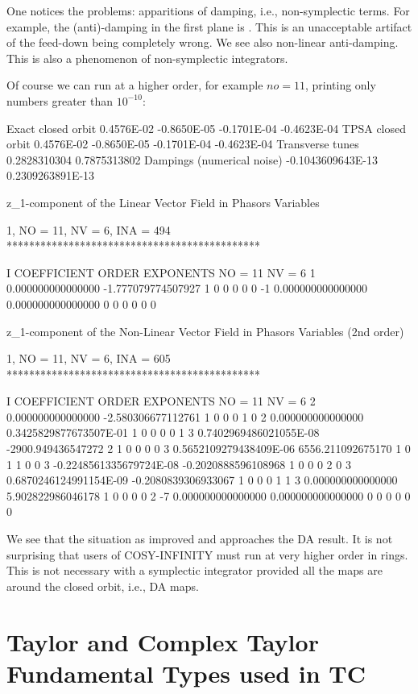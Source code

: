 \documentclass{hitec}     %
\newcommand{\Section}[1]{\section{#1}\vspace*{-1ex}}
\begin{document}
{{ 
 One notices the problems: apparitions of damping, i.e., non-symplectic terms. For example, the (anti)-damping in the first plane is . This is an unacceptable artifact of the feed-down being completely wrong. We see also non-linear anti-damping. This is also a phenomenon of non-symplectic integrators.
 
 
 Of course we can run at a higher order, for example $no=11$, printing only numbers greater than $10^{-10}$:
 
 \begin{code}
Exact closed orbit  0.4576E-02 -0.8650E-05 -0.1701E-04 -0.4623E-04
TPSA  closed orbit  0.4576E-02 -0.8650E-05 -0.1701E-04 -0.4623E-04
 Transverse tunes
  0.2828310304       0.7875313802
 Dampings (numerical noise)
 -0.1043609643E-13   0.2309263891E-13

 z_1-component of the Linear Vector Field in Phasors Variables

          1, NO =   11, NV =    6, INA =  494
 *********************************************

    I  COEFFICIENT          ORDER   EXPONENTS
      NO =    11      NV =     6
   1   0.000000000000000      -1.777079774507927       1  0  0  0  0  0
    -1   0.000000000000000       0.000000000000000       0  0  0  0  0  0

 z_1-component of the Non-Linear Vector Field in Phasors Variables (2nd order)

          1, NO =   11, NV =    6, INA =  605
 *********************************************

    I  COEFFICIENT          ORDER   EXPONENTS
      NO =    11      NV =     6
   2   0.000000000000000      -2.580306677112761       1  0  0  0  1  0
   2   0.000000000000000      0.3425829877673507E-01   1  0  0  0  0  1
   3  0.7402969486021055E-08  -2900.949436547272       2  1  0  0  0  0
   3  0.5652109279438409E-06   6556.211092675170       1  0  1  1  0  0
   3 -0.2248561335679724E-08 -0.2020888596108968       1  0  0  0  2  0
   3  0.6870246124991154E-09 -0.2080839306933067       1  0  0  0  1  1
   3   0.000000000000000       5.902822986046178       1  0  0  0  0  2
    -7   0.000000000000000       0.000000000000000       0  0  0  0  0  0
 \end{code}
  \renewcommand{\codefont}{\small}
  
 We see that the situation as improved and approaches the DA result.     It is not surprising that users of COSY-INFINITY must run at very higher order in rings. This is not necessary with a symplectic integrator provided all the maps are around the closed orbit, i.e., DA maps.
\Section{Taylor and Complex Taylor Fundamental Types used in TC}
\label{s:fundamental}
 
}}
\end{document}
